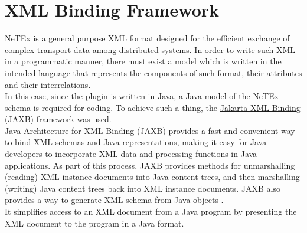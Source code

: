\section{XML Binding Framework}
NeTEx is a general purpose XML format designed for the efficient exchange of complex transport data among distributed systems. In order to write such XML in a programmatic manner, there must exist a model which is written in the intended language that represents the components of such format, their attributes and their interrelations.\\
In this case, since the plugin is written in Java, a Java model of the NeTEx schema is required for coding. To achieve such a thing, the \href{https://en.wikipedia.org/wiki/Jakarta_XML_Binding}{Jakarta XML Binding (JAXB)} framework was used.\\
\newline
Java Architecture for XML Binding (JAXB) provides a fast and convenient way to bind XML schemas and Java representations, making it easy for Java developers to incorporate XML data and processing functions in Java applications. As part of this process, JAXB provides methods for unmarshalling (reading) XML instance documents into Java content trees, and then marshalling (writing) Java content trees back into XML instance documents. JAXB also provides a way to generate XML schema from Java objects . \cite{WhatIsJAXB}\\ 
It simplifies access to an XML document from a Java program by presenting the XML document to the program in a Java format.
